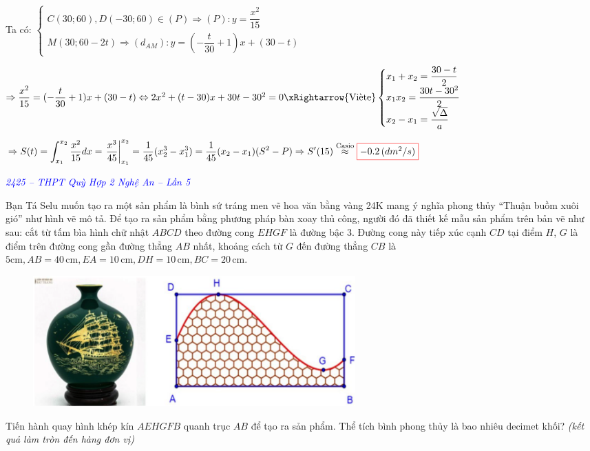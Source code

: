 \documentclass[twoside,final]{hcmut-report}
\newcommand{\exercise}[1]{\begin{exercisebox}#1\end{exercisebox}}
\newcommand{\result}[1]{\fcolorbox{red}{white}{#1}}
\renewcommand{\cite}[1]{``#1''}
\begin{document}
Ta có:
$\begin{cases}
        C(30; 60), D(-30;60)\in (P) \Rightarrow (P):y=\dfrac{x^2}{15} \\
        M(30; 60 - 2t) \Rightarrow (d_{AM}):y=(-\dfrac{t}{30}+1)x + (30-t)
    \end{cases}$\par
$\Rightarrow \dfrac{x^2}{15} = (-\dfrac{t}{30}+1)x + (30-t) \Leftrightarrow 2x^2 + (t - 30)x + 30t - 30^2 = 0 \xRightarrow{\text{Viète}}\begin{cases}
        x_1 + x_2 =\dfrac{30-t}{2}  \\
        x_1x_2 =\dfrac{30t-30^2}{2} \\
        x_2 - x_1 =\dfrac{\sqrt{\Delta}}{a}
    \end{cases}$\par
$\Rightarrow S(t) = \displaystyle \int_{x_1}^{x_2}\dfrac{x^2}{15}dx = \left. \frac{x^3}{45} \right|_{x_1}^{x_2} = \dfrac{1}{45}(x_2^3 - x_1^3) = \dfrac{1}{45}(x_2-x_1)(S^2 - P) \Rightarrow S'(15) \overset{\text{Casio}}{\approx} \result{$-0.2\,(dm^2/s)$}$
\exercise{
    \textcolor{blue}{\textit{2425 -- THPT Quỳ Hợp 2 Nghệ An -- Lần 5}}

    Bạn Tá Selu muốn tạo ra một sản phẩm là bình sứ tráng men vẽ hoa văn bằng vàng 24K mang ý nghĩa phong thủy \cite{Thuận buồm xuôi gió} như hình vẽ mô tả. Để tạo ra sản phẩm bằng phương pháp bàn xoay thủ công, người đó đã thiết kế mẫu sản phẩm trên bản vẽ như sau: cắt từ tấm bìa hình chữ nhật $ABCD$ theo đường cong $EHGF$ là đường bậc 3. Đường cong này tiếp xúc cạnh $CD$ tại điểm $H$, $G$ là điểm trên đường cong gần đường thẳng $AB$ nhất, khoảng cách từ $G$ đến đường thẳng $CB$ là $5\text{cm}, AB = 40\,\text{cm}, EA = 10\,\text{cm}, DH = 10\,\text{cm}, BC = 20\,\text{cm}$.

    \begin{figure}[H]
        \centering
        \includegraphics*[width=0.6\textwidth]{images/Ứng dụng tích phân/QH2.png}
    \end{figure}

    Tiến hành quay hình khép kín $AEHGFB$ quanh trục $AB$ để tạo ra sản phẩm. Thể tích bình phong thủy là bao nhiêu decimet khối? \textit{(kết quả làm tròn đến hàng đơn vị)}}
\end{document}
